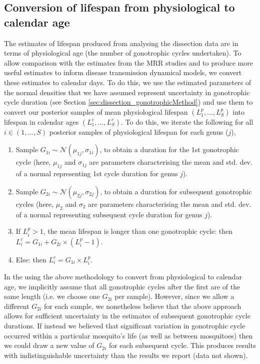 \documentclass[12pt]{article}
\begin{document}
{\subsection{Conversion of lifespan from physiological to calendar age}\label{sec:dissection_conversion}
The estimates of lifespan produced from analysing the dissection data are in terms of physiological age (the number of gonotrophic cycles undertaken). To allow comparison with the estimates from the MRR studies and to produce more useful estimates to inform disease transmission dynamical models, we convert these estimates to calendar days. To do this, we use the estimated parameters of the normal densities that we have assumed represent uncertainty in gonotrophic cycle duration (see Section \ref{sec:dissection_gonotrophicMethod}) and use them to convert our posterior samples of mean physiological lifespan $(L^p_1,...,L^p_S)$ into lifespan in calendar ages $(L^c_1,...,L^c_S)$. To do this, we iterate the following for all $i\in (1,...,S)$ posterior samples of physiological lifespan for each genus ($j$),

\begin{enumerate}
	\item Sample $G_{1i} \sim \mathcal{N}(\mu_{1j},\sigma_{1i})$, to obtain a duration for the 1st gonotrophic cycle (here, $\mu_{1j}$ and $\sigma_{1j}$ are parameters characterising the mean and std. dev. of a normal representing 1st cycle duration for genus $j$).
	\item Sample $G_{2i} \sim \mathcal{N}(\mu_{2j},\sigma_{2j})$, to obtain a duration for subsequent gonotrophic cycles (here, $\mu_2$ and $\sigma_2$ are parameters characterising the mean and std. dev. of a normal representing subsequent cycle duration for genus $j$).
	\item If $L^p_i > 1$, the mean lifespan is longer than one gonotrophic cycle:
	\subitem then $L^c_i = G_{1i} + G_{2i} \times (L^p_i - 1)$.
	\item Else:
	\subitem then $L^c_i = G_{1i}\times L^p_i$.
\end{enumerate}

In the using the above methodology to convert from physiological to calendar age, we implicitly assume that all gonotrophic cycles after the first are of the same length (i.e. we choose one $G_{2i}$ per sample). However, since we allow a different $G_{2i}$ for each sample, we nonetheless believe that the above approach allows for sufficient uncertainty in the estimates of subsequent gonotrophic cycle durations. If instead we believed that significant variation in gonotrophic cycle occurred within a particular mosquito's life (as well as between mosquitoes) then we could draw a new value of $G_{2i}$ for each subsequent cycle. This produces results with indistinguishable uncertainty than the results we report (data not shown).

}
\end{document}
